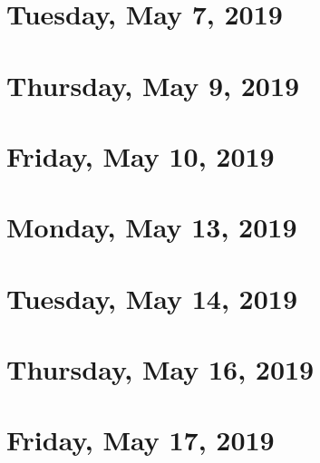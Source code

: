 \documentclass[reqno]{amsart}
\begin{document}
\section{Tuesday, May 7, 2019}
    
\section{Thursday, May 9, 2019}
    
\section{Friday, May 10, 2019}
    
    
\section{Monday, May 13, 2019}
    
\section{Tuesday, May 14, 2019}
    
\section{Thursday, May 16, 2019}
    
\section{Friday, May 17, 2019}
    
\end{document}
